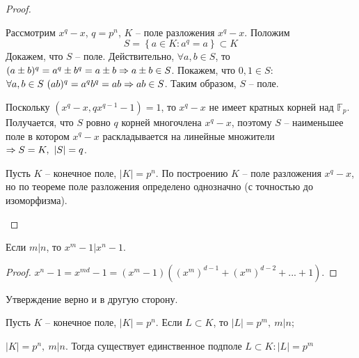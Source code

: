 \begin{proof}
	\begin{MyList}
		\item Рассмотрим $x^q - x$, $q = p^n$, $K$ -- поле разложения $x^q - x$. Положим
		\[S = \left\{a \in K : a^q = a\right\} \subset K\]
		Докажем, что $S$ -- поле. Действительно, $\forall a, b \in S$, то $(a \pm b)^q = a^q \pm b^q = a \pm b \Rightarrow a \pm b \in S$.
		Покажем, что $0, 1 \in S$: $\forall a, b \in S \ (ab)^q = a^q b^q = ab \Rightarrow ab \in S$.   
		Таким образом, $S$ -- поле.

		Поскольку $(x^q - x, qx^{q - 1} - 1) = 1$, то $x^q - x$ не имеет кратных корней над $\mathbb{F}_p$.
		Получается, что $S$ ровно $q$ корней многочлена $x^q - x$, поэтому $S$ -- наименьшее поле в котором $x^q - x$ раскладывается на линейные множители $\Rightarrow S = K, \ |S| = q$.

		\item Пусть $K$ -- конечное поле, $|K| = p^n$. По построению $K$ -- поле разложения $x^q - x$, но по теореме поле разложения определено однозначно (с точностью до изоморфизма).
	\end{MyList}
\end{proof}

\begin{Lm}
	Если $m | n$, то $x^m - 1 | x^n - 1$.
\end{Lm}

\begin{proof}
	$x^n - 1 = x^{md} - 1 = (x^m - 1)\left((x^m)^{d - 1} + (x^m)^{d - 2} + ... + 1\right)$. 
\end{proof}

\begin{Rem}
	Утверждение верно и в другую сторону.
\end{Rem}

\begin{Thm}
	\begin{MyList}
		\item Пусть $K$ -- конечное поле, $|K| = p^n$. Если $L \subset K$, то $|L| = p^m, \ m | n$;
		\item $|K| = p^n, \ m | n$. Тогда существует единственное подполе $L \subset K : |L| = p^m$
	\end{MyList}
\end{Thm}


